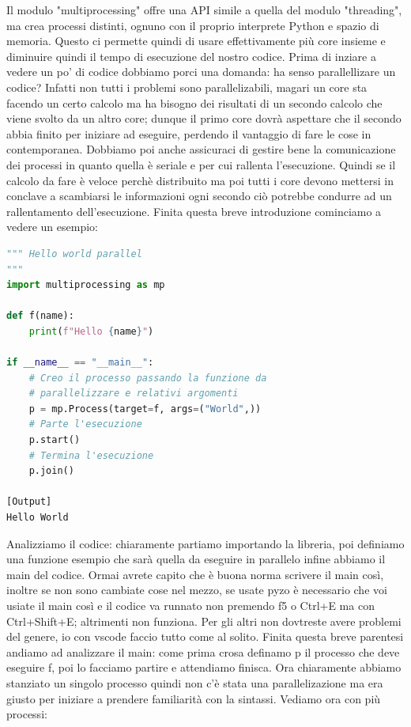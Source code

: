 \documentclass[10pt,a4paper]{article}
\begin{document}
Il modulo "multiprocessing" offre una API simile a quella del modulo "threading", ma crea processi distinti, ognuno con il proprio interprete Python e spazio di memoria. Questo ci permette quindi di usare effettivamente più core insieme e diminuire quindi il tempo di esecuzione del nostro codice. Prima di inziare a vedere un po' di codice dobbiamo porci una domanda: ha senso parallellizare un codice? Infatti non tutti i problemi sono parallelizabili, magari un core sta facendo un certo calcolo ma ha bisogno dei risultati di un secondo calcolo che viene svolto da un altro core; dunque il primo core dovrà aspettare che il secondo abbia finito per iniziare ad eseguire, perdendo il vantaggio di fare le cose in contemporanea. Dobbiamo poi anche assicuraci di gestire bene la comunicazione dei processi in quanto quella è seriale e per cui rallenta l'esecuzione. Quindi se il calcolo da fare è veloce perchè distribuito ma poi tutti i core devono mettersi in conclave a scambiarsi le informazioni ogni secondo ciò potrebbe condurre ad un rallentamento dell'esecuzione. Finita questa breve introduzione cominciamo a vedere un esempio:
\begin{lstlisting}[language=Python]
""" Hello world parallel
"""
import multiprocessing as mp

def f(name):
    print(f"Hello {name}")

if __name__ == "__main__":
    # Creo il processo passando la funzione da
    # parallelizzare e relativi argomenti
    p = mp.Process(target=f, args=("World",))
    # Parte l'esecuzione
    p.start()
    # Termina l'esecuzione
    p.join()

[Output]
Hello World
\end{lstlisting}
Analizziamo il codice: chiaramente partiamo importando la libreria, poi definiamo una funzione esempio che sarà quella da eseguire in parallelo infine abbiamo il main del codice.
Ormai avrete capito che è buona norma scrivere il main così, inoltre se non sono cambiate cose nel mezzo, se usate pyzo è necessario che voi usiate il main così e il codice va runnato non premendo f5 o Ctrl+E ma con Ctrl+Shift+E; altrimenti non funziona. Per gli altri non dovtreste avere problemi del genere, io con vscode faccio tutto come al solito. Finita questa breve parentesi andiamo ad analizzare il main: come prima crosa definamo p il processo che deve eseguire f, poi lo facciamo partire e attendiamo finisca. Ora chiaramente abbiamo stanziato un singolo processo quindi non c'è stata una parallelizazione ma era giusto per iniziare a prendere familiarità con la sintassi. Vediamo ora con più processi:
\end{document}
